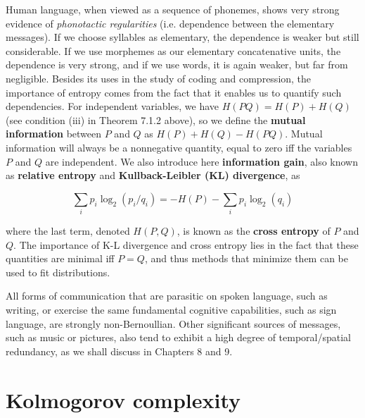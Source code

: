 \smallskip\noindent
Human language, when viewed as a sequence of phonemes, shows very strong
evidence of {\it phonotactic regularities} (i.e. dependence between the
elementary messages). If we choose syllables as elementary, the dependence is
weaker but still considerable. If we use morphemes as our elementary
concatenative units, the dependence is very strong, and if we use words, it is
again weaker, but far from negligible. Besides its uses in the study of coding
and compression, the importance of entropy comes from the fact that it enables
us to quantify such dependencies. For independent variables, we have
$H(PQ)=H(P)+H(Q)$ (see condition (iii) in Theorem 7.1.2 above), so we define
the {\bf mutual information} between $P$ and $Q$ as $H(P)+H(Q)-H(PQ)$. Mutual
information will always be a nonnegative quantity, equal to zero iff the
variables $P$ and $Q$ are independent. We also introduce here {\bf information
gain}, also known as {\bf relative entropy} and {\bf Kullback-Leibler (KL)
divergence}, as 

\begin{equation}
\sum_i p_i\log_2(p_i/q_i)=-H(P)-\sum_i p_i\log_2(q_i)
\end{equation}

\smallskip\noindent
where the last term, denoted $H(P,Q)$, is known as the {\bf cross entropy} of 
$P$ and $Q$. The importance of K-L divergence and cross entropy lies in 
the fact that these quantities are minimal iff $P=Q$, and thus methods 
that minimize them can be used to fit distributions.

All forms of communication that are parasitic on spoken language, such as
writing, or exercise the same fundamental cognitive capabilities, such as sign
language, are strongly non-Bernoullian. Other significant sources of messages,
such as music or pictures, also tend to exhibit a high degree of
temporal/spatial redundancy, as we shall discuss in Chapters 8 and 9. 

\section{Kolmogorov complexity}

